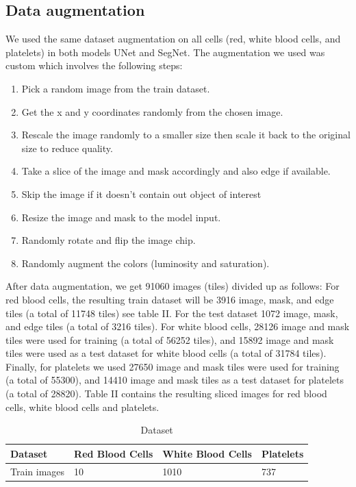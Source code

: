 \documentclass[conference]{IEEEtran}
\begin{document}
\subsection{Data augmentation}
We used the same dataset augmentation on all cells (red, white blood cells, and platelets) in both models UNet and SegNet. The augmentation we used was custom which involves the following steps:
\begin{enumerate}
\item Pick a random image from the train dataset.
\item Get the x and y coordinates randomly from the chosen image.
\item Rescale the image randomly to a smaller size then scale it back to the original size to reduce quality.
\item Take a slice of the image and mask accordingly and also edge if available.
\item Skip the image if it doesn’t contain out object of interest
\item Resize the image and mask to the model input.
\item Randomly rotate and flip the image chip.
\item Randomly augment the colors (luminosity and saturation).
\end{enumerate}
After data augmentation, we get 91060 images (tiles) divided up as follows: For red blood cells, the resulting train dataset will be 3916 image, mask, and edge tiles (a total of 11748 tiles) see table II. For the test dataset 1072 image, mask, and edge tiles (a total of 3216 tiles). For white blood cells, 28126 image and mask tiles were used for training (a total of 56252 tiles), and 15892 image and mask tiles were used as a test dataset for white blood cells (a total of 31784 tiles). Finally, for platelets we used 27650 image and mask tiles were used for training (a total of 55300), and 14410 image and mask tiles as a test dataset for platelets (a total of 28820). Table II contains the resulting sliced images for red blood cells, white blood cells and platelets.
\begin{table}[htbp]
\centering
\caption{Dataset}
\label{tab:dataset}
\begin{tabular}{llll}
\hline
Dataset & Red Blood Cells & White Blood Cells & Platelets \\
\hline
Train images & 10 & 1010 & 737 \\
\hline
\end{tabular}
\end{table}
\end{document}
